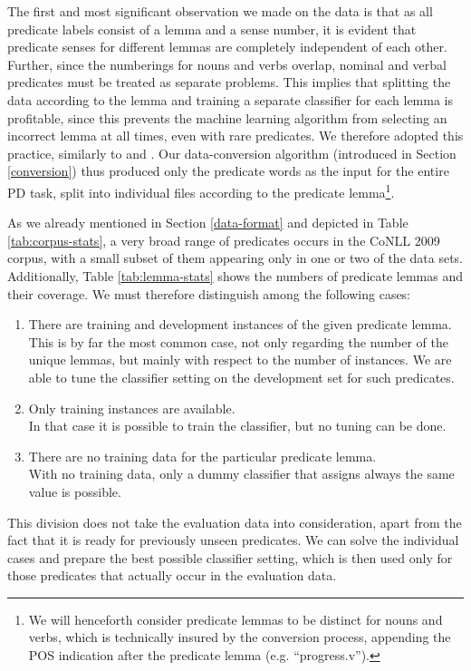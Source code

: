 \documentclass[12pt,notitlepage]{report}
\begin{document}
The first and most significant observation we made on the data is that as all predicate labels consist of a lemma and a sense number, it is evident that predicate senses for different lemmas are completely independent of each other. Further, since the numberings for nouns and verbs overlap, nominal and verbal predicates must be treated as separate problems. This implies that splitting the data according to the lemma and training a separate classifier for each lemma is profitable, since this prevents the machine learning algorithm from selecting an incorrect lemma at all times, even with rare predicates. We therefore adopted this practice, similarly to \citet{che09} and \citet{nugues09}. Our data-conversion algorithm (introduced in Section \ref{conversion}) thus produced only the predicate words as the input for the entire PD task, split into individual files according to the predicate lemma\footnote{We will henceforth consider predicate lemmas to be distinct for nouns and verbs, which is technically insured by the conversion process, appending the POS indication after the predicate lemma (e.g. ``progress.v'').}.

As we already mentioned in Section \ref{data-format} and depicted in Table \ref{tab:corpus-stats}, a very broad range of predicates occurs in the CoNLL 2009 corpus, with a small subset of them appearing only in one or two of the data sets. Additionally, Table \ref{tab:lemma-stats} shows the numbers of predicate lemmas and their coverage. We must therefore distinguish among the following cases:
\begin{enumerate}
    \item There are training and development instances of the given predicate lemma. \\
This is by far the most common case, not only regarding the number of the unique lemmas, but mainly with respect to the number of instances. We are able to tune the classifier setting on the development set for such predicates.
    \item Only training instances are available. \\
In that case it is possible to train the classifier, but no tuning can be done. 
    \item There are no training data for the particular predicate lemma. \\
With no training data, only a dummy classifier that assigns always the same value is possible.
\end{enumerate}
This division does not take the evaluation data into consideration, apart from the fact that it is ready for previously unseen predicates. We can solve the individual cases and prepare the best possible classifier setting, which is then used only for those predicates that actually occur in the evaluation data.
\end{document}
